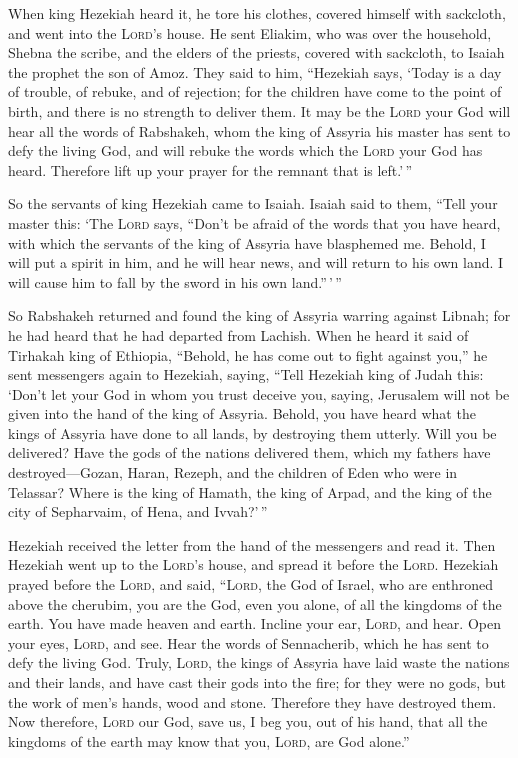  When king Hezekiah heard it, he tore his clothes, covered
himself with sackcloth, and went into the \textsc{Lord}'s house.
 He sent Eliakim, who was over the household, Shebna the
scribe, and the elders of the priests, covered with sackcloth, to Isaiah
the prophet the son of Amoz.  They said to him, ``Hezekiah
says, `Today is a day of trouble, of rebuke, and of rejection; for the
children have come to the point of birth, and there is no strength to
deliver them.  It may be the \textsc{Lord} your God will
hear all the words of Rabshakeh, whom the king of Assyria his master has
sent to defy the living God, and will rebuke the words which the
\textsc{Lord} your God has heard. Therefore lift up your prayer for the
remnant that is left.'\,''

 So the servants of king Hezekiah came to Isaiah.
 Isaiah said to them, ``Tell your master this: `The
\textsc{Lord} says, ``Don't be afraid of the words that you have heard,
with which the servants of the king of Assyria have blasphemed me.
 Behold, I will put a spirit in him, and he will hear
news, and will return to his own land. I will cause him to fall by the
sword in his own land.''\,'\,''

 So Rabshakeh returned and found the king of Assyria
warring against Libnah; for he had heard that he had departed from
Lachish.  When he heard it said of Tirhakah king of
Ethiopia, ``Behold, he has come out to fight against you,'' he sent
messengers again to Hezekiah, saying,  ``Tell Hezekiah
king of Judah this: `Don't let your God in whom you trust deceive you,
saying, Jerusalem will not be given into the hand of the king of
Assyria.  Behold, you have heard what the kings of
Assyria have done to all lands, by destroying them utterly. Will you be
delivered?  Have the gods of the nations delivered them,
which my fathers have destroyed---Gozan, Haran, Rezeph, and the children
of Eden who were in Telassar?  Where is the king of
Hamath, the king of Arpad, and the king of the city of Sepharvaim, of
Hena, and Ivvah?'\,''

 Hezekiah received the letter from the hand of the
messengers and read it. Then Hezekiah went up to the \textsc{Lord}'s
house, and spread it before the \textsc{Lord}.  Hezekiah
prayed before the \textsc{Lord}, and said, ``\textsc{Lord}, the God of
Israel, who are enthroned above the cherubim, you are the God, even you
alone, of all the kingdoms of the earth. You have made heaven and earth.
 Incline your ear, \textsc{Lord}, and hear. Open your
eyes, \textsc{Lord}, and see. Hear the words of Sennacherib, which he
has sent to defy the living God.  Truly, \textsc{Lord},
the kings of Assyria have laid waste the nations and their lands,
 and have cast their gods into the fire; for they were no
gods, but the work of men's hands, wood and stone. Therefore they have
destroyed them.  Now therefore, \textsc{Lord} our God,
save us, I beg you, out of his hand, that all the kingdoms of the earth
may know that you, \textsc{Lord}, are God alone.''

